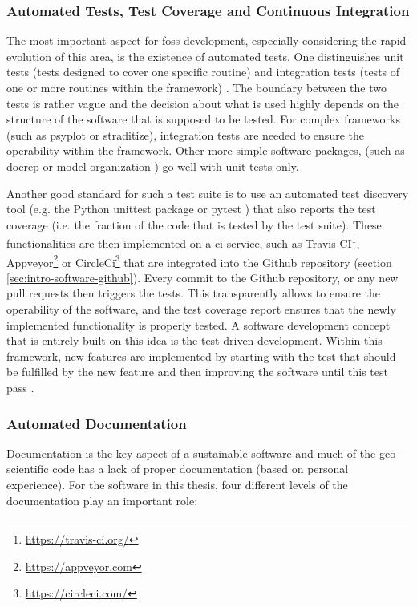 \documentclass[
11pt, %
english, %
singlespacing, %
headsepline, %
]{MastersDoctoralThesis} %
\begin{document}
\begin{NoHyper}
\begin{refsection}
\subsubsection{Automated Tests, Test Coverage and Continuous Integration} \label{sec:intro-software-ci}
The most important aspect for \gls{foss} development, especially considering the rapid evolution of this area, is the existence of automated tests. One distinguishes unit tests (tests designed to cover one specific routine) and integration tests (tests of one or more routines within the framework) \citep{Shaw2018}. The boundary between the two tests is rather vague and the decision about what is used highly depends on the structure of the software that is supposed to be tested. For complex frameworks (such as psyplot or straditize), integration tests are needed to ensure the operability within the framework. Other more simple software packages, (such as docrep or model-organization \citep{Sommer2018a, Sommer2018b}) go well with unit tests only.

Another good standard for such a test suite is to use an automated test discovery tool (e.g. the Python unittest package \citep{PSF2019} or pytest \citep{KrekelOliveiraPfannschmidtEtAl2004}) that also reports the test coverage (i.e. the fraction of the code that is tested by the test suite). These functionalities are then implemented on a \gls{ci} service, such as Travis CI\footnote{\url{https://travis-ci.org/}}, Appveyor\footnote{\url{https://appveyor.com}} or CircleCi\footnote{\url{https://circleci.com/}} that are integrated into the Github repository (section \ref{sec:intro-software-github}). Every commit to the Github repository, or any new pull requests then triggers the tests. This transparently allows to ensure the operability of the software, and the test coverage report ensures that the newly implemented functionality is properly tested. A software development concept that is entirely built on this idea is the test-driven development. Within this framework, new features are implemented by starting with the test that should be fulfilled by the new feature and then improving the software until this test pass \citep{Beck2002}.


\subsubsection{Automated Documentation} \label{sec:intro-software-docs}
Documentation is the key aspect of a sustainable software and much of the geo-scientific code has a lack of proper documentation (based on personal experience). For the software in this thesis, four different levels of the documentation play an important role:


\end{refsection}
\end{NoHyper}
\end{document}
